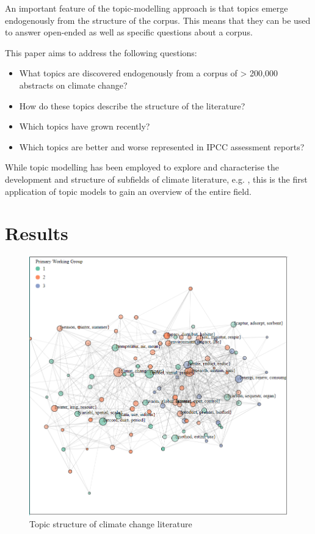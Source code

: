 \documentclass{article}
\begin{document}
An important feature of the topic-modelling approach is that topics emerge endogenously from the structure of the corpus. This means that they can be used to answer open-ended as well as specific questions about a corpus. 

This paper aims to address the following questions:

\begin{itemize}
	\item What topics are discovered endogenously from a corpus of > 200,000 abstracts on climate change?
	\item How do these topics describe the structure of the literature?
	\item Which topics have grown recently?
	\item Which topics are better and worse represented in IPCC assessment reports?
\end{itemize}

While topic modelling has been employed to explore and characterise the development and structure of subfields of climate literature, e.g. \citep[e.g.][]{Minx2017c, Grubert2016}, this is the first application of topic models to gain an overview of the entire field.









\section*{Results}


\begin{figure}
\begin{center}
	\includegraphics[width=0.7\linewidth]{plots/network_wg_65}
    \caption{Topic structure of climate change literature}
    \label{network}
    \end{center}
\end{figure}
\end{document}
